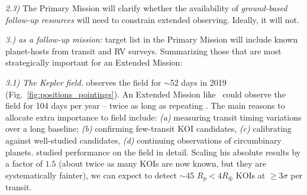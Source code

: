 \textit{2.3)} 
The Primary Mission will clarify whether the availability of \textit{ground-based follow-up resources} will need to constrain \tesss extended observing.
Ideally, it will not.

\textit{3.) \tess as a follow-up mission:}
\tesss target list in the Primary Mission will include known planet-hosts from transit and RV surveys.
Summarizing those that are most strategically important for an Extended Mission:

\textit{3.1) The Kepler field.} \tess observes the \kepler field for $\sim$52 days in 2019 (Fig.~\ref{fig:positions_pointings}).
An Extended Mission like \npole\ could observe the field for 104 days per year -- twice as long as repeating \nhemi.
The main reasons to allocate extra importance to \keplers field include:
\textit{(a)} measuring transit timing variations over a long baseline;
\textit{(b)} confirming few-transit KOI candidates, 
\textit{(c)} calibrating \tess against well-studied candidates,
\textit{(d)} continuing observations of circumbinary planets.
\citet{sullivan_KOIs_2013} studied \tesss performance on the field in detail.
Scaling his absolute results by a factor of $1.5$ (about twice as many KOIs are now known, but they are systematically fainter), we can expect \tess to detect $\sim$45 $R_p<4R_\oplus$ KOIs at $\geq3\sigma$ per transit.

